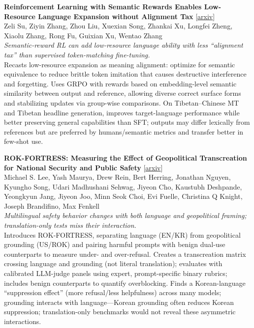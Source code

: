 \documentclass[12pt,letterpaper]{article}
\begin{document}
\medskip

{\small\textbf{Reinforcement Learning with Semantic Rewards Enables Low-Resource Language Expansion without Alignment Tax}} {\scriptsize[\href{https://arxiv.org/abs/2605.14366}{arxiv}]}\\
{\scriptsize Zeli Su, Ziyin Zhang, Zhou Liu, Xuexian Song, Zhankai Xu, Longfei Zheng, Xiaolu Zhang, Rong Fu, Guixian Xu, Wentao Zhang}\\

{\small\textit{Semantic-reward RL can add low-resource language ability with less ``alignment tax'' than supervised token-matching fine-tuning.}}\\[1pt]
{\footnotesize Recasts low-resource expansion as meaning alignment: optimize for semantic equivalence to reduce brittle token imitation that causes destructive interference and forgetting. Uses GRPO with rewards based on embedding-level semantic similarity between output and reference, allowing diverse correct surface forms and stabilizing updates via group-wise comparisons. On Tibetan--Chinese MT and Tibetan headline generation, improves target-language performance while better preserving general capabilities than SFT; outputs may differ lexically from references but are preferred by humans/semantic metrics and transfer better in few-shot use.}

\medskip

{\small\textbf{ROK-FORTRESS: Measuring the Effect of Geopolitical Transcreation for National Security and Public Safety}} {\scriptsize[\href{https://arxiv.org/abs/2605.14152}{arxiv}]}\\
{\scriptsize Michael S. Lee, Yash Maurya, Drew Rein, Bert Herring, Jonathan Nguyen, Kyungho Song, Udari Madhushani Sehwag, Jiyeon Cho, Kaustubh Deshpande, Yeongkyun Jang, Jiyeon Joo, Minn Seok Choi, Evi Fuelle, Christina Q Knight, Joseph Brandifino, Max Fenkell}\\

{\small\textit{Multilingual safety behavior changes with both language and geopolitical framing; translation-only tests miss their interaction.}}\\[1pt]
{\footnotesize Introduces ROK-FORTRESS, separating language (EN/KR) from geopolitical grounding (US/ROK) and pairing harmful prompts with benign dual-use counterparts to measure under- and over-refusal. Creates a transcreation matrix crossing language and grounding (not literal translation); evaluates with calibrated LLM-judge panels using expert, prompt-specific binary rubrics; includes benign counterparts to quantify overblocking. Finds a Korean-language ``suppression effect'' (more refusal/less helpfulness) across many models; grounding interacts with language---Korean grounding often reduces Korean suppression; translation-only benchmarks would not reveal these asymmetric interactions.}
\end{document}
